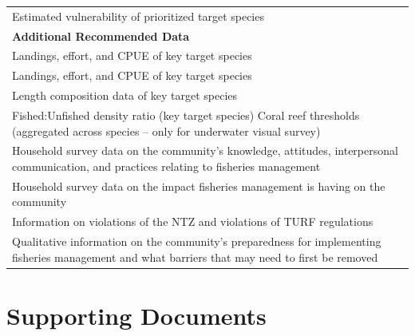 \documentclass[]{book}
\begin{document}
\begin{longtable}[]{@{}l@{}}
\begin{minipage}[t]{0.97\columnwidth}
Estimated vulnerability of prioritized target species\strut
\end{minipage}\tabularnewline
\begin{minipage}[t]{0.48\columnwidth}\raggedright\strut
\textbf{Additional Recommended Data}\strut
\end{minipage}\tabularnewline
\begin{minipage}[t]{0.48\columnwidth}\raggedright\strut
Landings, effort, and CPUE of key target species\strut
\end{minipage}\tabularnewline
\begin{minipage}[t]{0.48\columnwidth}\raggedright\strut
Landings, effort, and CPUE of key target species\strut
\end{minipage}\tabularnewline
\begin{minipage}[t]{0.48\columnwidth}\raggedright\strut
Length composition data of key target species\strut
\end{minipage}\tabularnewline
\begin{minipage}[t]{0.48\columnwidth}\raggedright\strut
Fished:Unfished density ratio (key target species) Coral reef thresholds
(aggregated across species -- only for underwater visual survey)\strut
\end{minipage}\tabularnewline
\begin{minipage}[t]{0.48\columnwidth}\raggedright\strut
Household survey data on the community's knowledge, attitudes,
interpersonal communication, and practices relating to fisheries
management\strut
\end{minipage}\tabularnewline
\begin{minipage}[t]{0.48\columnwidth}\raggedright\strut
Household survey data on the impact fisheries management is having on
the community\strut
\end{minipage}\tabularnewline
\begin{minipage}[t]{0.48\columnwidth}\raggedright\strut
Information on violations of the NTZ and violations of TURF
regulations\strut
\end{minipage}\tabularnewline
\begin{minipage}[t]{0.48\columnwidth}\raggedright\strut
Qualitative information on the community's preparedness for implementing
fisheries management and what barriers that may need to first be
removed\strut
\end{minipage}\tabularnewline
\bottomrule
\end{longtable}

\section{Supporting Documents}\label{supporting-documents}
\end{document}
